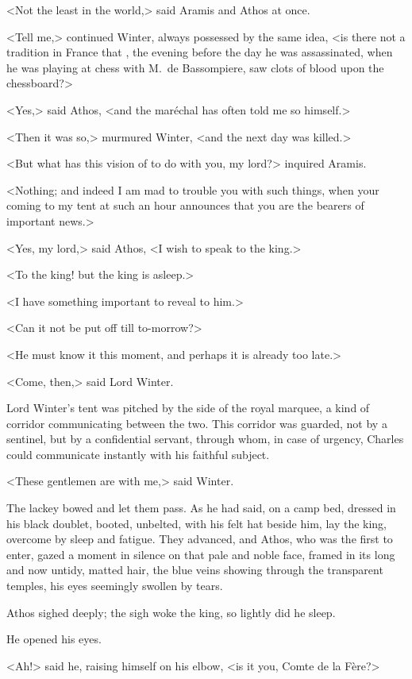 <Not the least in the world,> said Aramis and Athos at once.

<Tell me,> continued Winter, always possessed by the same idea, <is there not a tradition in France that , the evening before the day he was assassinated, when he was playing at chess with M.~de Bassompiere, saw clots of blood upon the chessboard?>

<Yes,> said Athos, <and the maréchal has often told me so himself.>

<Then it was so,> murmured Winter, <and the next day  was killed.>

<But what has this vision of  to do with you, my lord?> inquired Aramis.

<Nothing; and indeed I am mad to trouble you with such things, when your coming to my tent at such an hour announces that you are the bearers of important news.>

<Yes, my lord,> said Athos, <I wish to speak to the king.>

<To the king! but the king is asleep.>

<I have something important to reveal to him.>

<Can it not be put off till to-morrow?>

<He must know it this moment, and perhaps it is already too late.>

<Come, then,> said Lord Winter.

Lord Winter's tent was pitched by the side of the royal marquee, a kind of corridor communicating between the two. This corridor was guarded, not by a sentinel, but by a confidential servant, through whom, in case of urgency, Charles could communicate instantly with his faithful subject.

<These gentlemen are with me,> said Winter.

The lackey bowed and let them pass. As he had said, on a camp bed, dressed in his black doublet, booted, unbelted, with his felt hat beside him, lay the king, overcome by sleep and fatigue. They advanced, and Athos, who was the first to enter, gazed a moment in silence on that pale and noble face, framed in its long and now untidy, matted hair, the blue veins showing through the transparent temples, his eyes seemingly swollen by tears.

Athos sighed deeply; the sigh woke the king, so lightly did he sleep.

He opened his eyes.

<Ah!> said he, raising himself on his elbow, <is it you, Comte de la Fère?>

